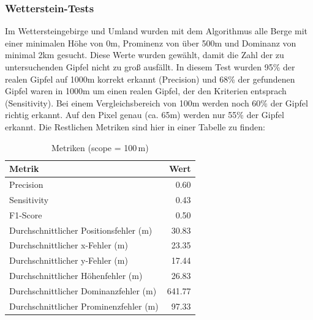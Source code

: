 \subsubsection{Wetterstein-Tests}
Im Wettersteingebirge und Umland wurden mit dem Algorithmus alle Berge mit einer minimalen Höhe von 0m, Prominenz von über 500m und Dominanz von minimal 2km gesucht. Diese Werte wurden gewählt, damit die Zahl der zu untersuchenden Gipfel nicht zu groß ausfällt. In diesem Test wurden 95\% der realen Gipfel auf 1000m korrekt erkannt (Precision) und 68\% der gefundenen Gipfel waren in 1000m um einen realen Gipfel, der den Kriterien entsprach (Sensitivity).  Bei einem Vergleichsbereich von 100m werden noch 60\% der Gipfel richtig erkannt. Auf den Pixel genau (ca. 65m) werden nur 55\% der Gipfel erkannt. Die Restlichen Metriken sind hier in einer Tabelle zu finden: 


\begin{table}[htbp]
\centering
\caption{Metriken (scope = 100\,m)}
\label{tab:metrics_100m_circular}
\begin{tabular}{|l|r|}
\hline
Metrik & Wert \\
\hline
Precision & 0.60 \\
\hline
Sensitivity & 0.43 \\
\hline
F1-Score & 0.50 \\
\hline
Durchschnittlicher Positionsfehler (m) & 30.83 \\
\hline
Durchschnittlicher x-Fehler (m) & 23.35 \\
\hline
Durchschnittlicher y-Fehler (m) & 17.44 \\
\hline
Durchschnittlicher Höhenfehler (m) & 26.83 \\
\hline
Durchschnittlicher Dominanzfehler (m) & 641.77 \\
\hline
Durchschnittlicher Prominenzfehler (m) & 97.33 \\
\hline
\end{tabular}
\end{table}

